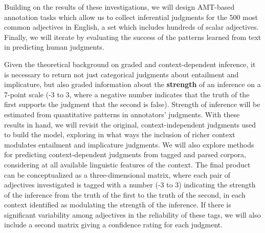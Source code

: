 \documentclass[10pt]{article}
\begin{document}
Building on the results of these investigations, we will design AMT-based annotation tasks which allow us to collect inferential judgments for the 500 most common adjectives in English, a set which includes hundreds of scalar adjectives. Finally, we will iterate by evaluating the success of the patterns learned from text in predicting human judgments.

Given the theoretical background on graded and context-dependent inference, it is necessary to return not just categorical judgments about entailment and implicature, but also graded information about the \textbf{strength} of an inference on a 7-point scale (-3 to 3, where a negative number indicates that the truth of the first supports the judgment that the second is false).  Strength of inference will be estimated from quantitative patterns in annotators' judgments. With these results in hand, we will revisit the original, context-independent judgments used to build the model, exploring in what ways the inclusion of richer context modulates entailment and implicature judgments. We will also explore methods for predicting context-dependent judgments from tagged and parsed corpora, considering at all available linguistic features of the context. The final product can be conceptualized as a three-dimensional matrix, where each pair of adjectives investigated is tagged with a number (-3 to 3) indicating the strength of the inference from the truth of the first to the truth of the second, in each context identified as modulating the strength of the inference. If there is significant variability among adjectives in the reliability of these tags, we will also include a second matrix giving a confidence rating for each judgment.
\end{document}
